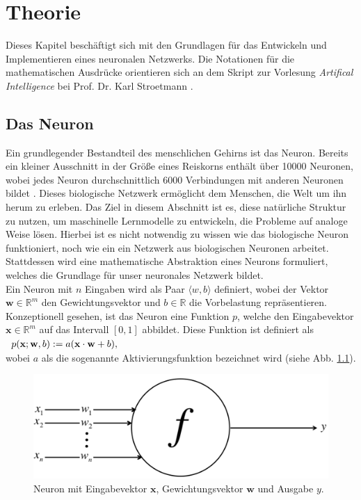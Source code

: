 \chapter{Theorie}
Dieses Kapitel beschäftigt sich mit den Grundlagen für das Entwickeln und Implementieren eines neuronalen Netzwerks. Die Notationen für die mathematischen Ausdrücke orientieren sich an dem Skript zur Vorlesung \textit{Artifical Intelligence} bei Prof. Dr. Karl Stroetmann \cite{stroetmann:2017}.

\section{Das Neuron}
Ein grundlegender Bestandteil des menschlichen Gehirns ist das Neuron. Bereits ein kleiner Ausschnitt in der Größe eines Reiskorns enthält über 10000 Neuronen, wobei jedes Neuron durchschnittlich 6000 Verbindungen mit anderen Neuronen bildet \cite{buduma:2017}. Dieses biologische Netzwerk ermöglicht dem Menschen, die Welt um ihn herum zu erleben. Das Ziel in diesem Abschnitt ist es, diese natürliche Struktur zu nutzen, um maschinelle Lernmodelle zu entwickeln, die Probleme auf analoge Weise lösen. Hierbei ist es nicht notwendig zu wissen wie das biologische Neuron funktioniert, noch wie ein ein Netzwerk aus biologischen Neuronen arbeitet. Stattdessen wird eine mathematische Abstraktion eines Neurons formuliert, welches die Grundlage für unser neuronales Netzwerk bildet. \\
Ein Neuron mit $n$ Eingaben wird als Paar $\langle w,b \rangle$ definiert, wobei der Vektor $\mathbf{w} \in \mathbb{R}^m$ den Gewichtungsvektor und $b \in \mathbb{R}$ die Vorbelastung repräsentieren. Konzeptionell gesehen, ist das Neuron eine Funktion $p$, welche den Eingabevektor $\mathbf{x} \in \mathbb{R}^m$ auf das Intervall $[0,1]$ abbildet. Diese Funktion ist definiert als \\[0.2cm]
\hspace*{1.3cm}
$
\begin{array}[t]{lclll}
	p(\mathbf{x};\mathbf{w},b) := a(\mathbf{x}\cdot\mathbf{w}+b),
\end{array}
$
\\[0.2cm]
wobei $a$ als die sogenannte Aktivierungsfunktion bezeichnet wird (siehe Abb. \ref{fig:perceptron}).
\begin{figure}[hbt]
	\centering
	\includegraphics[scale=0.25]{Bilder/sigmoid_neuron}
	\caption{Neuron mit Eingabevektor $\mathbf{x}$, Gewichtungsvektor $\mathbf{w}$ und Ausgabe $y$. \cite{buduma:2017}} 
	\label{fig:perceptron} 
\end{figure}

